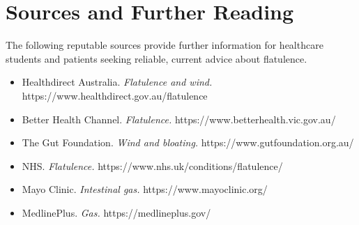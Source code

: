 \section*{Sources and Further Reading}
The following reputable sources provide further information for healthcare students and patients seeking reliable, current advice about flatulence.
\begin{itemize}
    \item Healthdirect Australia. \textit{Flatulence and wind.} https://www.healthdirect.gov.au/flatulence
    \item Better Health Channel. \textit{Flatulence.} https://www.betterhealth.vic.gov.au/
    \item The Gut Foundation. \textit{Wind and bloating.} https://www.gutfoundation.org.au/
    \item NHS. \textit{Flatulence.} https://www.nhs.uk/conditions/flatulence/
    \item Mayo Clinic. \textit{Intestinal gas.} https://www.mayoclinic.org/
    \item MedlinePlus. \textit{Gas.} https://medlineplus.gov/
\end{itemize}

